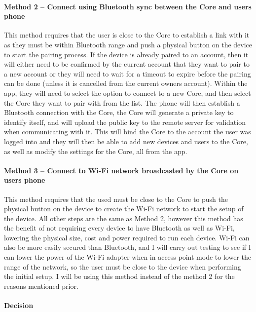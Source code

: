 \documentclass[10pt, a4paper]{article}
\begin{document}
\paragraph{Method 2 – Connect using Bluetooth sync between the Core and users phone}
This method requires that the user is close to the Core to establish a link with it as they must be within Bluetooth range and push a physical button on the device to start the pairing process. If the device is already paired to an account, then it will either need to be confirmed by the current account that they want to pair to a new account or they will need to wait for a timeout to expire before the pairing can be done (unless it is cancelled from the current owners account). Within the app, they will need to select the option to connect to a new Core, and then select the Core they want to pair with from the list. The phone will then establish a Bluetooth connection with the Core, the Core will generate a private key to identify itself, and will upload the public key to the remote server for validation when communicating with it. This will bind the Core to the account the user was logged into and they will then be able to add new devices and users to the Core, as well as modify the settings for the Core, all from the app.

\paragraph{Method 3 – Connect to Wi-Fi network broadcasted by the Core on users phone}
This method requires that the used must be close to the Core to push the physical button on the device to create the Wi-Fi network to start the setup of the device. All other steps are the same as Method 2, however this method has the benefit of not requiring every device to have Bluetooth as well as Wi-Fi, lowering the physical size, cost and power required to run each device. Wi-Fi can also be more easily secured than Bluetooth, and I will carry out testing to see if I can lower the power of the Wi-Fi adapter when in access point mode to lower the range of the network, so the user must be close to the device when performing the initial setup. I will be using this method instead of the method 2 for the reasons mentioned prior.

\paragraph{Decision}
\end{document}
